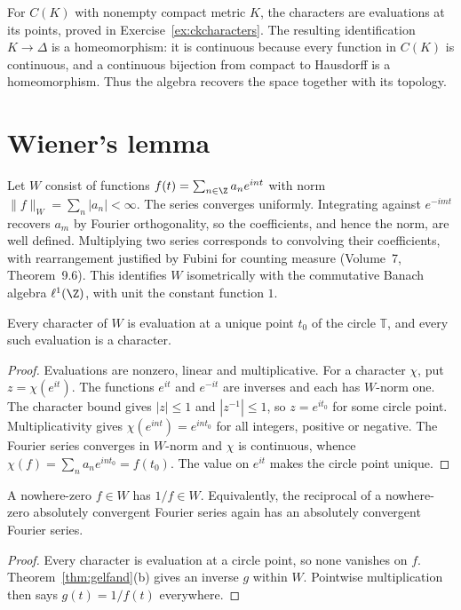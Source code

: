 For $C(K)$ with nonempty compact metric $K$, the characters are evaluations at its points, proved in Exercise~\ref{ex:ckcharacters}. The resulting identification $K\to\Delta$ is a homeomorphism: it is continuous because every function in $C(K)$ is continuous, and a continuous bijection from compact to Hausdorff is a homeomorphism. Thus the algebra recovers the space together with its topology.

\section{Wiener's lemma}\label{sec:wienerlemma}

Let $W$ consist of functions $f(t)=\sum_{n\in\Z}a_ne^{int}$ with norm $\|f\|_W=\sum_n|a_n|<\infty$. The series converges uniformly. Integrating against $e^{-imt}$ recovers $a_m$ by Fourier orthogonality, so the coefficients, and hence the norm, are well defined. Multiplying two series corresponds to convolving their coefficients, with rearrangement justified by Fubini for counting measure (Volume~7, Theorem~9.6). This identifies $W$ isometrically with the commutative Banach algebra $\ell^1(\Z)$, with unit the constant function $1$.

\begin{proposition}\label{prop:wcharacters}
Every character of $W$ is evaluation at a unique point $t_0$ of the circle $\mathbb T$, and every such evaluation is a character.
\end{proposition}
\begin{proof}
Evaluations are nonzero, linear and multiplicative. For a character $\chi$, put $z=\chi(e^{it})$. The functions $e^{it}$ and $e^{-it}$ are inverses and each has $W$-norm one. The character bound gives $|z|\le1$ and $|z^{-1}|\le1$, so $z=e^{it_0}$ for some circle point. Multiplicativity gives $\chi(e^{int})=e^{int_0}$ for all integers, positive or negative. The Fourier series converges in $W$-norm and $\chi$ is continuous, whence $\chi(f)=\sum_na_ne^{int_0}=f(t_0)$. The value on $e^{it}$ makes the circle point unique.
\end{proof}

\begin{theorem}\label{thm:wiener}
A nowhere-zero $f\in W$ has $1/f\in W$. Equivalently, the reciprocal of a nowhere-zero absolutely convergent Fourier series again has an absolutely convergent Fourier series.
\end{theorem}
\begin{proof}
Every character is evaluation at a circle point, so none vanishes on $f$. Theorem~\ref{thm:gelfand}(b) gives an inverse $g$ within $W$. Pointwise multiplication then says $g(t)=1/f(t)$ everywhere.
\end{proof}

